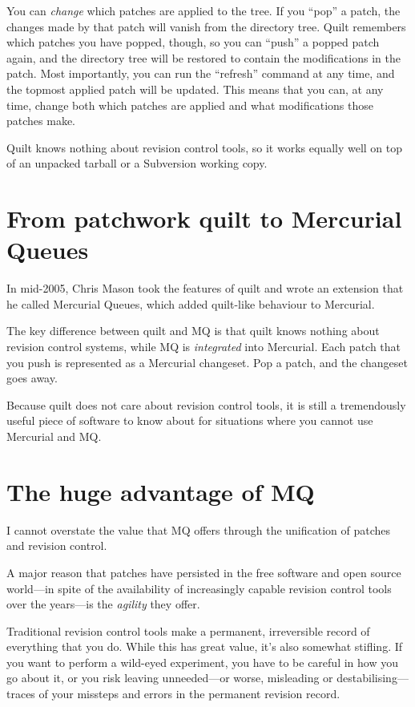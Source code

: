 You can \emph{change} which patches are applied to the tree.  If you
``pop'' a patch, the changes made by that patch will vanish from the
directory tree.  Quilt remembers which patches you have popped,
though, so you can ``push'' a popped patch again, and the directory
tree will be restored to contain the modifications in the patch.  Most
importantly, you can run the ``refresh'' command at any time, and the
topmost applied patch will be updated.  This means that you can, at
any time, change both which patches are applied and what
modifications those patches make.

Quilt knows nothing about revision control tools, so it works equally
well on top of an unpacked tarball or a Subversion working copy.

\section{From patchwork quilt to Mercurial Queues}
\label{sec:mq:quilt-mq}

In mid-2005, Chris Mason took the features of quilt and wrote an
extension that he called Mercurial Queues, which added quilt-like
behaviour to Mercurial.

The key difference between quilt and MQ is that quilt knows nothing
about revision control systems, while MQ is \emph{integrated} into
Mercurial.  Each patch that you push is represented as a Mercurial
changeset.  Pop a patch, and the changeset goes away.

Because quilt does not care about revision control tools, it is still
a tremendously useful piece of software to know about for situations
where you cannot use Mercurial and MQ.

\section{The huge advantage of MQ}

I cannot overstate the value that MQ offers through the unification of
patches and revision control.

A major reason that patches have persisted in the free software and
open source world---in spite of the availability of increasingly
capable revision control tools over the years---is the \emph{agility}
they offer.  

Traditional revision control tools make a permanent, irreversible
record of everything that you do.  While this has great value, it's
also somewhat stifling.  If you want to perform a wild-eyed
experiment, you have to be careful in how you go about it, or you risk
leaving unneeded---or worse, misleading or destabilising---traces of
your missteps and errors in the permanent revision record.

